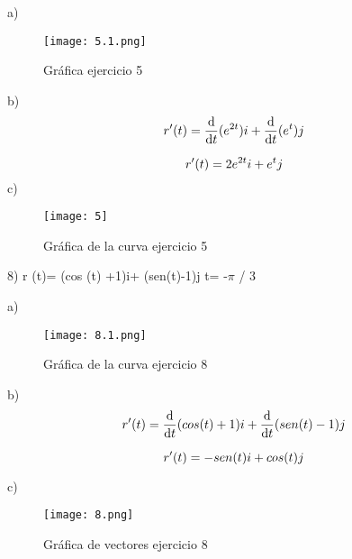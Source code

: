 a) 
\begin{figure} [H]
    \centering %
    \texttt{[image: 5.1.png]}
    \caption{Gráfica ejercicio 5}
    \label{fig:etiqueta}
\end{figure}
b) \vspace{1mm}
\begin{equation}
    \centering
    r'(t)= \frac{\mathrm{d} }{\mathrm{d} t}(e^{2t})i+ \frac{\mathrm{d} }{\mathrm{d} t}(e^t)j\vspace{1mm} 
\end{equation}



\begin{equation}
    \centering
    r'(t)= 2e^{2t}i+ e^tj \vspace{2mm} 
\end{equation}
\newpage
c) 
\begin{figure} [H]
    \centering %
    \texttt{[image: 5]}
    \caption{Gráfica de la curva ejercicio 5}
    \label{fig:etiqueta}
\end{figure}

\item 8) r (t)= (cos (t) +1)i+ (sen(t)-1)j \hspace{1cm} t= -$\pi$ / 3

a) 

\begin{figure} [H]
    \centering %
    \texttt{[image: 8.1.png]}
    \caption{Gráfica de la curva ejercicio 8}
    \label{fig:etiqueta}
\end{figure}

b) 
\begin{equation}
    \centering
    r'(t)= \frac{\mathrm{d} }{\mathrm{d} t}(cos(t)+1)i+ \frac{\mathrm{d} }{\mathrm{d} t}(sen(t)-1)j\vspace{1mm} 
\end{equation}



\begin{equation}
    \centering
    r'(t)= -sen(t)i + cos(t)j 
\end{equation} \newpage

c) 
\begin{figure} [H]
    \centering %
    \texttt{[image: 8.png]}
    \caption{Gráfica de vectores ejercicio 8}
    \label{fig:etiqueta}
\end{figure}

